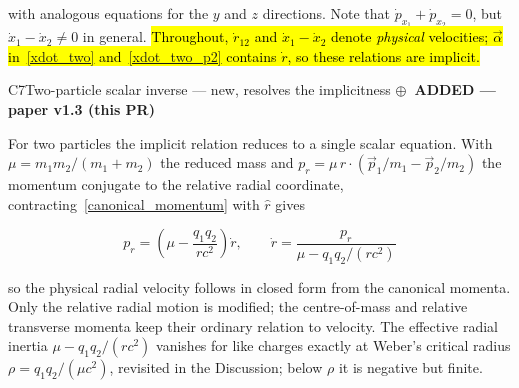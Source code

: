 \documentclass[12pt,a4paper]{article}
\theoremstyle{definition}
\theoremstyle{remark}
\newcommand{\newtag}{{\sffamily\bfseries\footnotesize
  \textcolor{newink}{$\oplus$~ADDED \textnormal{\textmd{— paper v1.3 (this PR)}}}}\par\smallskip}
\newcommand{\dins}[1]{\hl{#1}}
\newcommand{\eqnote}[1]{\par\smallskip{\footnotesize\sffamily\textcolor{barink}{#1}}\par}
\begin{document}
with analogous equations for the $y$ and $z$ directions. Note that $\dot{p}_{x_1} + \dot{p}_{x_2} = 0$, but $\dot{x}_1 - \dot{x}_2 \neq 0$ in general. \dins{Throughout, \mbox{$\dot{r}_{12}$} and \mbox{$\dot{x}_1 - \dot{x}_2$} denote \mbox{\textit{physical}} velocities; \mbox{$\vec{\alpha}$} in~\mbox{\eqref{xdot_two}} and~\mbox{\eqref{xdot_two_p2}} contains \mbox{$\dot{r}$}, so these relations are implicit.}

\begin{addbox}{C7}{Two-particle scalar inverse --- new, resolves the implicitness}
\newtag
For two particles the implicit relation reduces to a single scalar equation. With $\mu = m_1 m_2/(m_1+m_2)$ the reduced mass and $p_r = \mu\,\hat{r}\cdot(\vec{p}_1/m_1 - \vec{p}_2/m_2)$ the momentum conjugate to the relative radial coordinate, contracting~\eqref{canonical_momentum} with $\hat{r}$ gives

\begin{equation}\label{radial_inverse}
    \boxed{p_r = \left(\mu - \frac{q_1 q_2}{r c^2}\right)\dot{r}, \qquad \dot{r} = \frac{p_r}{\mu - q_1 q_2/(r c^2)}}
\end{equation}

so the physical radial velocity follows in closed form from the canonical momenta. Only the relative radial motion is modified; the centre-of-mass and relative transverse momenta keep their ordinary relation to velocity. The effective radial inertia $\mu - q_1 q_2/(r c^2)$ vanishes for like charges exactly at Weber's critical radius $\rho = q_1 q_2/(\mu c^2)$, revisited in the Discussion; below $\rho$ it is negative but finite.

\eqnote{Nothing corresponds to this in v1.2, which had no notion that the
velocity--momentum relation needed inverting at all. Note $p_r = \mu\dot r$ is
recovered only as $c\to\infty$.}
\end{addbox}
\end{document}
